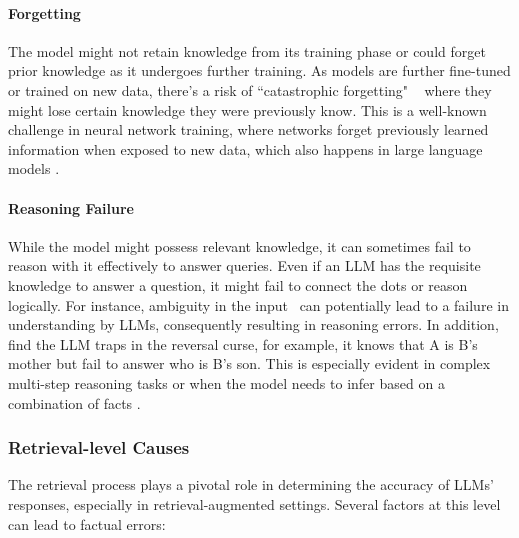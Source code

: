 \paragraph{Forgetting} The model might not retain knowledge from its training phase or could forget prior knowledge as it undergoes further training. As models are further fine-tuned or trained on new data, there's a risk of ``catastrophic forgetting" ~\citep{goodfellow2015empirical, wang2022preserving, chen2020recall, zhai2023investigating} where they might lose certain knowledge they were previously know. This is a well-known challenge in neural network training, where networks forget previously learned information when exposed to new data, which also happens in large language models \citep{luo2023empirical}.

\paragraph{Reasoning Failure} While the model might possess relevant knowledge, it can sometimes fail to reason with it effectively to answer queries. Even if an LLM has the requisite knowledge to answer a question, it might fail to connect the dots or reason logically. For instance, ambiguity in the input~\citep{liu2023we} can potentially lead to a failure in understanding by LLMs, consequently resulting in reasoning errors. In addition, \citet{berglund2023reversal} find the LLM traps in the reversal curse, for example, it knows that A is B's mother but fail to answer who is B's son. This is especially evident in complex multi-step reasoning tasks or when the model needs to infer based on a combination of facts \citep{tan2023chatgpt,kotha2023understanding}. 




\subsubsection{Retrieval-level Causes}
\label{sec:retrieval-causes}
The retrieval process plays a pivotal role in determining the accuracy of LLMs' responses, especially in retrieval-augmented settings. Several factors at this level can lead to factual errors:

